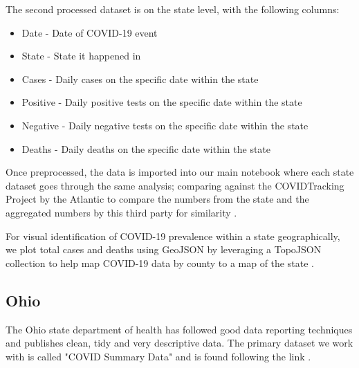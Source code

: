 \documentclass[conference]{IEEEtran}
\begin{document}
The second processed dataset is on the state level, with the following columns:
\begin{itemize}
  \item Date - Date of COVID-19 event
  \item State - State it happened in
  \item Cases - Daily cases on the specific date within the state
  \item Positive - Daily positive tests on the specific date within the state
  \item Negative - Daily negative tests on the specific date within the state
  \item Deaths - Daily deaths on the specific date within the state
\end{itemize}

Once preprocessed, the data is imported into our main notebook where each state dataset goes through the same analysis; comparing against the COVIDTracking Project by the Atlantic to compare the numbers from the state and the aggregated numbers by this third party for similarity \cite{covid19tracking_covid_nodate}.

For visual identification of COVID-19 prevalence within a state geographically, we plot total cases and deaths using GeoJSON by leveraging a TopoJSON collection to help map COVID-19 data by county to a map of the state \cite{eldersveld_topojson_nodate}.

\subsection{Ohio}
\label{Ohio}

The Ohio state department of health has followed good data reporting techniques and publishes clean, tidy and very descriptive data. The primary dataset we work with is called "COVID Summary Data" and is found following the link \cite{system_covid-19_nodate}.
\end{document}
